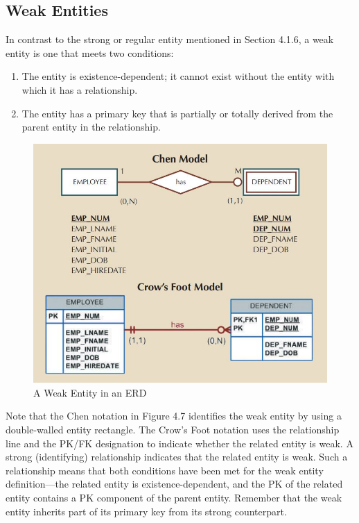 \documentclass[a4paper, 12pt, titlepage]{report}
\begin{document}
{\subsection{Weak Entities}
In contrast to the strong or regular entity mentioned in Section 4.1.6, a weak entity is one that meets two conditions:
\begin{enumerate}
\item The entity is existence-dependent; it cannot exist without the entity with which it has a relationship.
\item The entity has a primary key that is partially or totally derived from the parent entity in the relationship.
\end{enumerate}
\begin{figure}[H]
\centering
\includegraphics[scale=0.6]{Weak}
\caption{A Weak Entity in an ERD}
\end{figure}

\noindent Note that the Chen notation in Figure 4.7 identifies the weak entity by using a double-walled entity rectangle. The Crow’s Foot notation uses the relationship line and the PK/FK designation to indicate whether the related entity is weak. A strong (identifying) relationship indicates that the related entity is weak. Such a relationship means that both conditions have been met for the weak entity definition—the related entity is existence-dependent, and the PK of the related entity contains a PK component of the parent entity. Remember that the weak entity inherits part of its primary key from its strong counterpart. 

}
\end{document}
